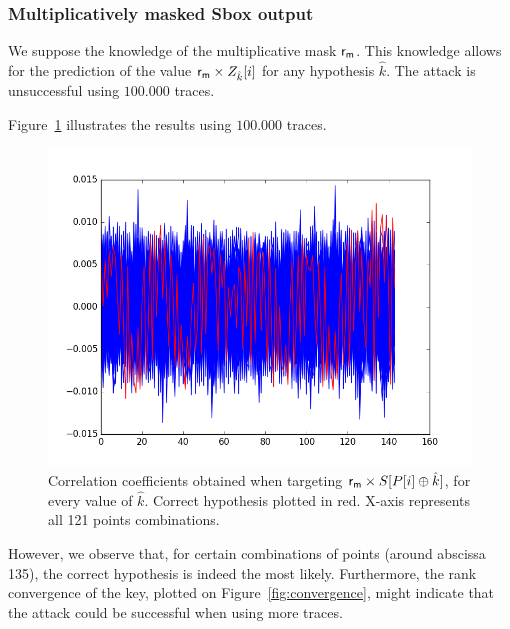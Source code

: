\subsubsection{Multiplicatively masked Sbox output}
We suppose the knowledge of the multiplicative mask $\mathsf{r_m}$. This knowledge allows for the prediction of the value $\mathsf{r_m} \times Z_{\hat{k}}[i]$ for any hypothesis $\hat{k}$.
The attack is unsuccessful using $100.000$ traces.

Figure~\ref{fig:CPA2O_averagedaZ1} illustrates the results using $100.000$ traces.
\begin{figure}[H]
	\centering 
	\includegraphics[scale=0.35]{figures/CPA2O_averagedaZ1.png}
	\caption{Correlation coefficients obtained when targeting $\mathsf{r_m} \times S[P[i]\oplus \hat{k}] $, for every value of $\hat{k}$. Correct hypothesis plotted in red. X-axis represents all 121 points combinations.}
	\label{fig:CPA2O_averagedaZ1}
\end{figure}

However, we observe that, for certain combinations of points (around abscissa 135), the correct hypothesis is indeed the most likely. Furthermore, the rank convergence of the key, plotted on Figure~\ref{fig:convergence}, might indicate that the attack could be successful when using more traces.

